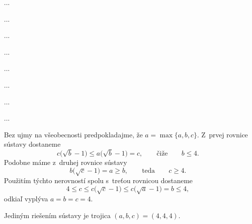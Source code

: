 {%
...}

{%
...}

{%
...}

{%
...}

{%
...}

{%
...}

{%
...}

{%
...}

{%
Bez ujmy na všeobecnosti predpokladajme, že $a=\max\{a,b,c\}$. Z~prvej rovnice sústavy dostaneme
$$
c\bigl(\sqrt{b}-1\bigr)\le a\bigl(\sqrt{b}-1\bigr)=c, \qquad \text{čiže}
\qquad b\le 4.
$$
Podobne máme z~druhej rovnice sústavy
$$
b\bigl(\sqrt{c}-1\bigr)=a\ge b, \qquad \text{teda} \qquad c\ge 4.
$$
Použitím týchto nerovností spolu s~treťou rovnicou dostaneme
$$
4\le c\le c\bigl(\sqrt{c}-1\bigr)\le c\bigl(\sqrt{a}-1\bigr)=b\le4,
$$
odkiaľ vyplýva $a=b=c=4$.

\odpoved
Jediným riešením sústavy je trojica $(a,b,c)=(4,4,4)$.
}


